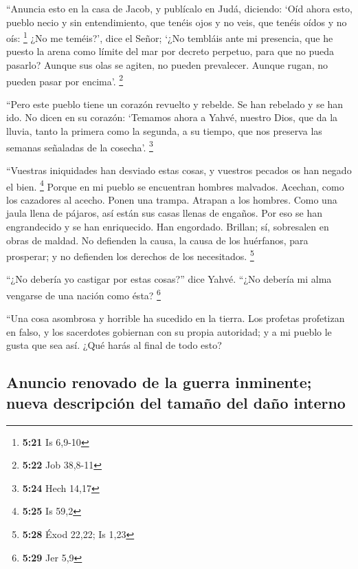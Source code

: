 ``Anuncia esto en la casa de Jacob, y publícalo en Judá,
diciendo:  `Oíd ahora esto, pueblo necio y sin
entendimiento, que tenéis ojos y no veis, que tenéis oídos y no oís:
\footnote{\textbf{5:21} Is 6,9-10}  ¿No me teméis?', dice
el Señor; `¿No tembláis ante mi presencia, que he puesto la arena como
límite del mar por decreto perpetuo, para que no pueda pasarlo? Aunque
sus olas se agiten, no pueden prevalecer. Aunque rugan, no pueden pasar
por encima'. \footnote{\textbf{5:22} Job 38,8-11}

 ``Pero este pueblo tiene un corazón revuelto y rebelde.
Se han rebelado y se han ido.  No dicen en su corazón:
`Temamos ahora a Yahvé, nuestro Dios, que da la lluvia, tanto la primera
como la segunda, a su tiempo, que nos preserva las semanas señaladas de
la cosecha'. \footnote{\textbf{5:24} Hech 14,17}

 ``Vuestras iniquidades han desviado estas cosas, y
vuestros pecados os han negado el bien. \footnote{\textbf{5:25} Is 59,2}
 Porque en mi pueblo se encuentran hombres malvados.
Acechan, como los cazadores al acecho. Ponen una trampa. Atrapan a los
hombres.  Como una jaula llena de pájaros, así están sus
casas llenas de engaños. Por eso se han engrandecido y se han
enriquecido.  Han engordado. Brillan; sí, sobresalen en
obras de maldad. No defienden la causa, la causa de los huérfanos, para
prosperar; y no defienden los derechos de los necesitados. \footnote{\textbf{5:28}
  Éxod 22,22; Is 1,23}

 ``¿No debería yo castigar por estas cosas?'' dice Yahvé.
``¿No debería mi alma vengarse de una nación como ésta? \footnote{\textbf{5:29}
  Jer 5,9}

 ``Una cosa asombrosa y horrible ha sucedido en la
tierra.  Los profetas profetizan en falso, y los
sacerdotes gobiernan con su propia autoridad; y a mi pueblo le gusta que
sea así. ¿Qué harás al final de todo esto?

\hypertarget{anuncio-renovado-de-la-guerra-inminente-nueva-descripciuxf3n-del-tamauxf1o-del-dauxf1o-interno}{%
\subsection{Anuncio renovado de la guerra inminente; nueva descripción
del tamaño del daño
interno}\label{anuncio-renovado-de-la-guerra-inminente-nueva-descripciuxf3n-del-tamauxf1o-del-dauxf1o-interno}}

